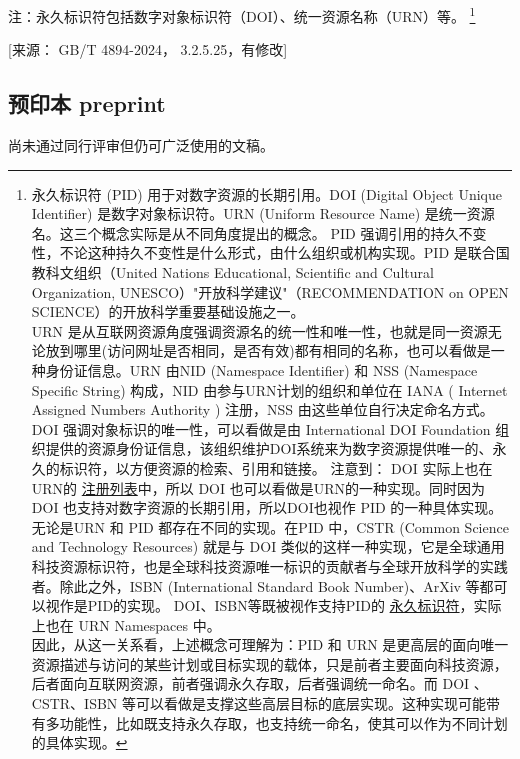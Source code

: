 \documentclass[twoside]{article}%
\begin{document}
{注：永久标识符包括数字对象标识符（DOI）、统一资源名称（URN）等。
\footnote{永久标识符 (PID) 用于对数字资源的长期引用。DOI (Digital Object Unique Identifier) 是数字对象标识符。URN (Uniform Resource Name) 是统一资源名。这三个概念实际是从不同角度提出的概念。\newline
PID 强调引用的持久不变性，不论这种持久不变性是什么形式，由什么组织或机构实现。PID 是联合国教科文组织（United Nations Educational, Scientific and Cultural Organization, UNESCO）"开放科学建议"（RECOMMENDATION on OPEN SCIENCE）的开放科学重要基础设施之一。\\
URN 是从互联网资源角度强调资源名的统一性和唯一性，也就是同一资源无论放到哪里(访问网址是否相同，是否有效)都有相同的名称，也可以看做是一种身份证信息。URN 由NID (Namespace Identifier) 和 NSS (Namespace Specific String) 构成，NID 由参与URN计划的组织和单位在 IANA ( Internet Assigned Numbers Authority ) 注册，NSS 由这些单位自行决定命名方式。\newline
DOI 强调对象标识的唯一性，可以看做是由 International DOI Foundation 组织提供的资源身份证信息，该组织维护DOI系统来为数字资源提供唯一的、永久的标识符，以方便资源的检索、引用和链接。\newline
注意到：
DOI 实际上也在URN的
\href{https://www.iana.org/assignments/urn-namespaces/urn-namespaces.xhtml}{注册列表}中，所以 DOI 也可以看做是URN的一种实现。同时因为 DOI 也支持对数字资源的长期引用，所以DOI也视作 PID 的一种具体实现。\\
无论是URN 和 PID 都存在不同的实现。在PID 中，CSTR (Common Science and Technology Resources) 就是与 DOI 类似的这样一种实现，它是全球通用科技资源标识符，也是全球科技资源唯一标识的贡献者与全球开放科学的实践者。除此之外，ISBN (International Standard Book Number)、ArXiv 等都可以视作是PID的实现。
DOI、ISBN等既被视作支持PID的
\href{https://pub.orcid.org/v3.0/identifiers}{永久标识符}，实际上也在 URN Namespaces 中。\\
因此，从这一关系看，上述概念可理解为：PID 和 URN 是更高层的面向唯一资源描述与访问的某些计划或目标实现的载体，只是前者主要面向科技资源，后者面向互联网资源，前者强调永久存取，后者强调统一命名。而 DOI 、CSTR、ISBN 等可以看做是支撑这些高层目标的底层实现。这种实现可能带有多功能性，比如既支持永久存取，也支持统一命名，使其可以作为不同计划的具体实现。}

[来源： GB/T 4894-2024， 3.2.5.25，有修改]

\subsection{预印本 preprint}
尚未通过同行评审但仍可广泛使用的文稿。


}
\end{document}
